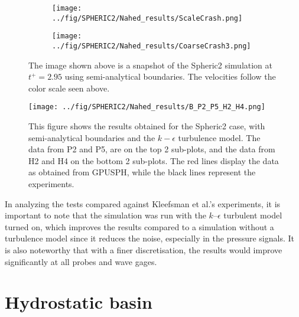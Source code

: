 \documentclass{../GPUSPHtemplate}
\begin{document}
\begin{figure}[H]
  \begin{subfigure}[b]{0.7\linewidth}
    \centering
    \hspace*{3.3cm} \texttt{[image: ../fig/SPHERIC2/Nahed\_results/ScaleCrash.png]}
  \end{subfigure}	
  
  
  \begin{subfigure}[b]{1\linewidth}
    \centering
    \texttt{[image: ../fig/SPHERIC2/Nahed\_results/CoarseCrash3.png]} 
  \end{subfigure} 
  
  \caption{The image shown above is a snapshot of the Spheric2 simulation at $t^+ = 2.95 $ using semi-analytical boundaries.
    The velocities follow the color scale  seen above.}
  \label{fig:Crash}
\end{figure}

\begin{figure}[H]
  \centering 	
    \texttt{[image: ../fig/SPHERIC2/Nahed\_results/B\_P2\_P5\_H2\_H4.png]}
    \caption{This figure shows the results obtained for the Spheric2 case, with semi-analytical boundaries and the $k-\epsilon$ turbulence model.
      The data from P2 and P5, are on the top 2 sub-plots, and the data from H2 and H4 on the bottom 2 sub-plots.
      The red lines display the data as obtained from GPUSPH, while the black lines represent the experiments.}
\label{fig:TestpointsAll}
\end{figure}


In analyzing the tests compared against Kleefsman et al.'s experiments,
it is important to note that the simulation was run with the $k$--$\epsilon$
turbulent model turned on, which improves the results compared to a simulation without
a turbulence model since it reduces the noise, especially in the pressure signals. 
It is also noteworthy that with a finer discretisation, the results would improve significantly at all probes
and wave gages.

\section{Hydrostatic basin}
\end{document}
